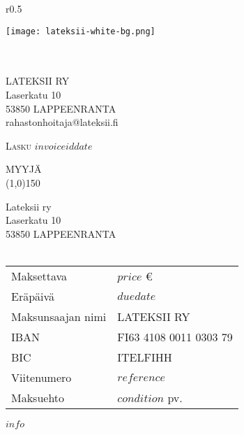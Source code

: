 \documentclass[10pt,titlepage,a4paper]{article}
\begin{document}
	\selectfont
	\renewcommand{\arraystretch}{1.2}
	\pagestyle{empty} 
	\begin{wrapfigure}[1]{r}{0.5\textwidth}
		\begin{center}
			\texttt{[image: lateksii-white-bg.png]}
		\end{center}
	\end{wrapfigure}
	\noindent 
	\\
	\\
	LATEKSII RY\\
	Laserkatu 10\\
	53850 LAPPEENRANTA\\
	rahastonhoitaja@lateksii.fi
	\vspace{4cm}
	\begin{tcolorbox}
		\textsc{\large Lasku $invoiceid$}\hfill{\large $date$}
	\end{tcolorbox}
	\vspace{5pt}
	\noindent
	\hspace{2pt}
	\begin{minipage}{.3\textwidth}
		\color{fuksia}
		\vspace{-7pt}
		MYYJÄ\\
		\color{black}
		\line(1,0){150}
		
		
		\vspace{2pt}
		Lateksii ry\\
		Laserkatu 10\\
		53850 LAPPEENRANTA
		\\
		\\
	\end{minipage}
	\begin{minipage}{.7\textwidth}
		\begin{flushright}
			\begin{tabular}{l l}
				Maksettava & $price$ \euro  \\
				Eräpäivä & $duedate$ \\
				Maksunsaajan nimi & LATEKSII RY\\
				IBAN & FI63 4108 0011 0303 79\\
				BIC & ITELFIHH\\
				Viitenumero & $reference$\\
				Maksuehto & $condition$ pv.
			\end{tabular}
		\end{flushright}
	\end{minipage}
	
	\vspace{2cm}
	\color{darkgray}
	$info$
	\vspace{\fill}
	
\end{document}
